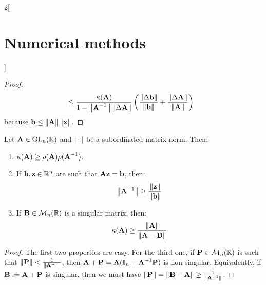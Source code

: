 \documentclass[../../../main_math.tex]{subfiles}
\begin{document}
\begin{multicols}{2}[\section{Numerical methods}]
\begin{proof}
\begin{align*}
                                                 & \leq\frac{\kappa(\vf{A})}{1-\norm{\vf{A}^{-1}}\norm{\Delta\vf{A}}}\left(\frac{\norm{\Delta\vf{b}}}{\norm{\vf{b}}}+\frac{\norm{\Delta\vf{A}}}{\norm{\vf{A}}}\right)
    \end{align*}
    because $\vf{b}\leq \norm{\vf{A}}\norm{\vf{x}}$.
  \end{proof}
  \begin{theorem}
    Let $\vf{A}\in\GL_n(\RR)$ and $\norm{\cdot}$ be a subordinated matrix norm. Then:
    \begin{enumerate}
      \item $\kappa(\vf{A})\geq\rho(\vf{A})\rho(\vf{A}^{-1})$.
      \item If $\vf{b},\vf{z}\in\RR^n$ are such that $\vf{A}\vf{z}=\vf{b}$, then: $$\norm{\vf{A}^{-1}}\geq\frac{\norm{\vf{z}}}{\norm{\vf{b}}}$$
      \item If $\vf{B}\in\mathcal{M}_n(\RR)$ is a singular matrix, then: $$\kappa(\vf{A})\geq\frac{\norm{\vf{A}}}{\norm{\vf{A}-\vf{B}}}$$
    \end{enumerate}
  \end{theorem}
  \begin{proof}
    The first two properties are easy. For the third one, if $\vf{P}\in\mathcal{M}_n(\RR)$ is such that $\norm{\vf{P}}<\frac{1}{\norm{\vf{A}^{-1}}}$, then $\vf{A}+\vf{P}=\vf{A}(\vf{I}_n+\vf{A}^{-1}\vf{P})$ is non-singular. Equivalently, if $\vf{B}:=\vf{A}+\vf{P}$ is singular, then we must have $\norm{\vf{P}}=\norm{\vf{B}-\vf{A}}\geq\frac{1}{\norm{\vf{A}^{-1}}}$.
  \end{proof}

\end{multicols}
\end{document}
